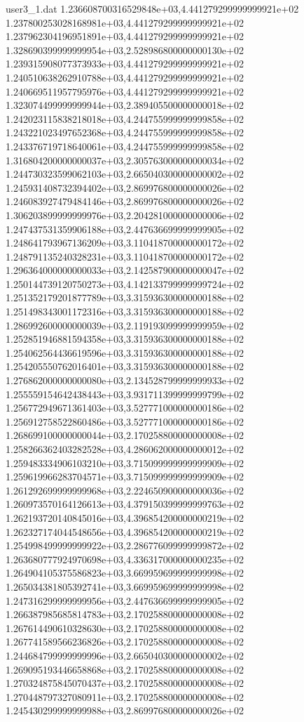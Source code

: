 \begin{filecontents}{user3_1.dat}
1.236608700316529848e+03,4.441279299999999921e+02
1.237800253028168981e+03,4.441279299999999921e+02
1.237962304196951891e+03,4.441279299999999921e+02
1.328690399999999954e+03,2.528986800000000130e+02
1.239315908077373933e+03,4.441279299999999921e+02
1.240510638262910788e+03,4.441279299999999921e+02
1.240669511957795976e+03,4.441279299999999921e+02
1.323074499999999944e+03,2.389405500000000018e+02
1.242023115838218018e+03,4.244755999999999858e+02
1.243221023497652368e+03,4.244755999999999858e+02
1.243376719718640061e+03,4.244755999999999858e+02
1.316804200000000037e+03,2.305763000000000034e+02
1.244730323599062103e+03,2.665040300000000002e+02
1.245931408732394402e+03,2.869976800000000026e+02
1.246083927479484146e+03,2.869976800000000026e+02
1.306203899999999976e+03,2.204281000000000006e+02
1.247437531359906188e+03,2.447636699999999905e+02
1.248641793967136209e+03,3.110418700000000172e+02
1.248791135240328231e+03,3.110418700000000172e+02
1.296364000000000033e+03,2.142587900000000047e+02
1.250144739120750273e+03,4.142133799999999724e+02
1.251352179201877789e+03,3.315936300000000188e+02
1.251498343001172316e+03,3.315936300000000188e+02
1.286992600000000039e+03,2.119193099999999959e+02
1.252851946881594358e+03,3.315936300000000188e+02
1.254062564436619596e+03,3.315936300000000188e+02
1.254205550762016401e+03,3.315936300000000188e+02
1.276862000000000080e+03,2.134528799999999933e+02
1.255559154642438443e+03,3.931711399999999799e+02
1.256772949671361403e+03,3.527771000000000186e+02
1.256912758522860486e+03,3.527771000000000186e+02
1.268699100000000044e+03,2.170258800000000008e+02
1.258266362403282528e+03,4.286062000000000012e+02
1.259483334906103210e+03,3.715099999999999909e+02
1.259619966283704571e+03,3.715099999999999909e+02
1.261292699999999968e+03,2.224650900000000036e+02
1.260973570164126613e+03,4.379150399999999763e+02
1.262193720140845016e+03,4.396854200000000219e+02
1.262327174044548656e+03,4.396854200000000219e+02
1.254998499999999922e+03,2.286776099999999872e+02
1.263680777924970698e+03,4.336317000000000235e+02
1.264904105375586823e+03,3.669959699999999998e+02
1.265034381805392741e+03,3.669959699999999998e+02
1.247316299999999956e+03,2.447636699999999905e+02
1.266387985685814783e+03,2.170258800000000008e+02
1.267614490610328630e+03,2.170258800000000008e+02
1.267741589566236826e+03,2.170258800000000008e+02
1.244684799999999996e+03,2.665040300000000002e+02
1.269095193446658868e+03,2.170258800000000008e+02
1.270324875845070437e+03,2.170258800000000008e+02
1.270448797327080911e+03,2.170258800000000008e+02
1.245430299999999988e+03,2.869976800000000026e+02

\end{filecontents}
